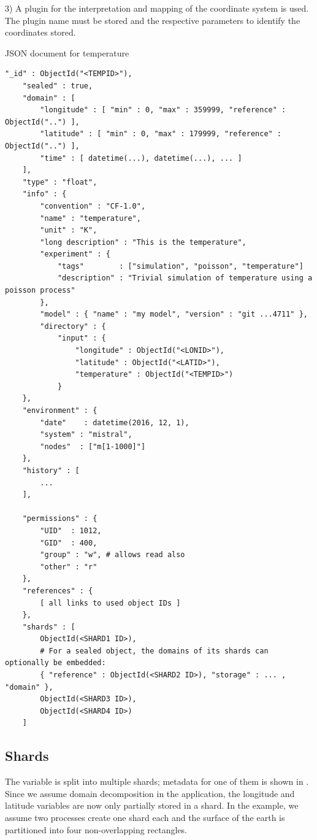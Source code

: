 3) A plugin for the interpretation and mapping of the coordinate system is used.
The plugin name must be stored and the respective parameters to identify the coordinates stored.


\begin{tcbcode}[label={lst:mongotemperature}]{JSON document for temperature}
	\begin{lstlisting}[upquote=true]
	"_id" : ObjectId("<TEMPID>"),
	"sealed" : true,
	"domain" : [
		"longitude" : [ "min" : 0, "max" : 359999, "reference" : ObjectId("..") ],
		"latitude" : [ "min" : 0, "max" : 179999, "reference" : ObjectId("..") ],
		"time" : [ datetime(...), datetime(...), ... ]
	],
	"type" : "float",
	"info" : {
		"convention" : "CF-1.0",
		"name" : "temperature",
		"unit" : "K",
		"long description" : "This is the temperature",
		"experiment" : {
			"tags"        : ["simulation", "poisson", "temperature"]
			"description" : "Trivial simulation of temperature using a poisson process"
		},
		"model" : { "name" : "my model", "version" : "git ...4711" },
		"directory" : {
			"input" : {
				"longitude" : ObjectId("<LONID>"),
				"latitude" : ObjectId("<LATID>"),
				"temperature" : ObjectId("<TEMPID>")
			}
	},
	"environment" : {
		"date"    : datetime(2016, 12, 1),
		"system" : "mistral",
		"nodes"  : ["m[1-1000]"]
	},
	"history" : [
		...
	],

	"permissions" : {
		"UID"  : 1012,
		"GID"  : 400,
		"group" : "w", # allows read also
		"other" : "r"
	},
	"references" : {
		[ all links to used object IDs ]
	},
	"shards" : [
		ObjectId(<SHARD1 ID>),
		# For a sealed object, the domains of its shards can optionally be embedded:
		{ "reference" : ObjectId(<SHARD2 ID>), "storage" : ... , "domain" },
		ObjectId(<SHARD3 ID>),
		ObjectId(<SHARD4 ID>)
	]
	\end{lstlisting}
\end{tcbcode}

\subsection{Shards}

The variable is split into multiple shards; metadata for one of them is shown in .
Since we assume domain decomposition in the application, the longitude and latitude variables are now only partially stored in a shard.
In the example, we assume two processes create one shard each and the surface of the earth is partitioned into four non-overlapping rectangles.


